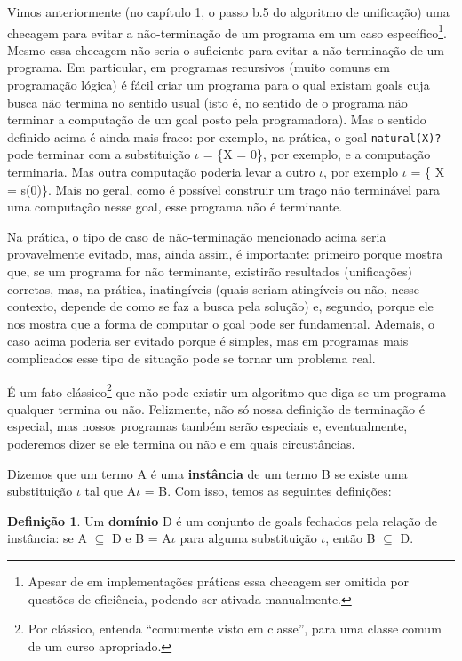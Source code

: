 \documentclass{article}
\theoremstyle{definition}
\newtheorem{definition}{Definição}[section]
\theoremstyle{remark}
\begin{document}
Vimos anteriormente (no capítulo 1, o passo b.5 do algoritmo de unificação) %
uma checagem para evitar a não-terminação de um programa em um caso específico\footnote{Apesar de em implementações práticas essa checagem ser omitida por questões de eficiência, podendo ser ativada manualmente.}.
Mesmo essa checagem não seria o suficiente para evitar a não-terminação de um programa.
Em particular, em programas recursivos (muito comuns em programação lógica) é fácil criar um programa para o qual existam goals cuja busca não termina no sentido usual (isto é, no sentido de o programa não terminar a computação de um goal posto pela programadora).
Mas o sentido definido acima é ainda mais fraco: por exemplo, na prática, o goal {\tt natural(X)?} pode terminar com a substituição $\iota$ = \{X = 0\}, por exemplo, e a computação terminaria. Mas outra computação poderia
levar a outro $\iota$, por exemplo $\iota$ = \{ X = s(0)\}. Mais no geral, como é possível construir um traço não terminável para uma computação nesse goal, esse programa não é terminante.

Na prática, o tipo de caso de não-terminação mencionado acima seria provavelmente evitado, mas, ainda assim, é importante: primeiro porque mostra que, se um programa for não terminante, existirão resultados (unificações) corretas, mas, na prática, inatingíveis (quais seriam atingíveis ou não, nesse contexto, depende de como se faz a busca pela solução) e, segundo, porque ele nos mostra que a forma de computar o goal pode ser fundamental. Ademais, o caso acima poderia ser evitado porque é simples, mas em programas mais complicados esse tipo de situação pode se tornar um problema real.

É um fato clássico\footnote{Por clássico, entenda ``comumente visto em classe'', para uma classe comum de um curso apropriado.} que não pode existir um algoritmo que diga se um programa qualquer termina ou não. Felizmente, não só nossa definição de terminação é especial, mas nossos programas também serão especiais e, eventualmente, poderemos dizer se ele termina ou não e em quais circustâncias.

Dizemos que um termo A é uma \textbf{instância} de um termo B se existe uma substituição $\iota$ tal que A$\iota$ = B. Com isso, temos as seguintes definições:

\begin{definition}
  Um \textbf{domínio} D é um conjunto de goals fechados pela relação de instância: se A $\subseteq$ D e B = A$\iota$ para alguma substituição $\iota$, então B $\subseteq$ D.
  \end{definition}
\end{document}
